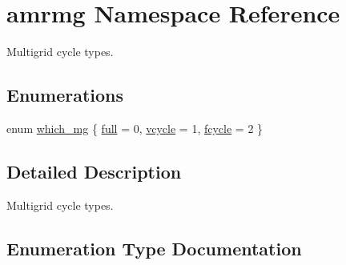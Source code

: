 \hypertarget{namespaceamrmg}{}\section{amrmg Namespace Reference}
\label{namespaceamrmg}


Multigrid cycle types.  


\subsection*{Enumerations}
\begin{DoxyCompactItemize}
\item 
enum \hyperlink{namespaceamrmg_aa3e75c1253c968e52106305f762a7952}{which\+\_\+mg} \{ \hyperlink{namespaceamrmg_aa3e75c1253c968e52106305f762a7952a39f49d43c37db32f88f26ad6f9090b70}{full} = 0, 
\hyperlink{namespaceamrmg_aa3e75c1253c968e52106305f762a7952abcef3ebc4ac4f095d5cf0e2e2b35c23e}{vcycle} = 1, 
\hyperlink{namespaceamrmg_aa3e75c1253c968e52106305f762a7952a158040c252d92b86566d6bd7047896b4}{fcycle} = 2
 \}
\end{DoxyCompactItemize}


\subsection{Detailed Description}
Multigrid cycle types. 

\subsection{Enumeration Type Documentation}
